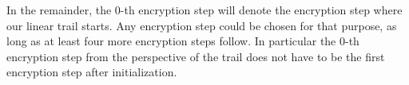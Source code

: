 In the remainder, the $0$-th encryption step will denote the encryption step where our linear trail starts. Any encryption step could be chosen for that purpose, as long as at least four more encryption steps follow. In particular the $0$-th encryption step from the perspective of the trail does not have to be the first encryption step after initialization.

%
